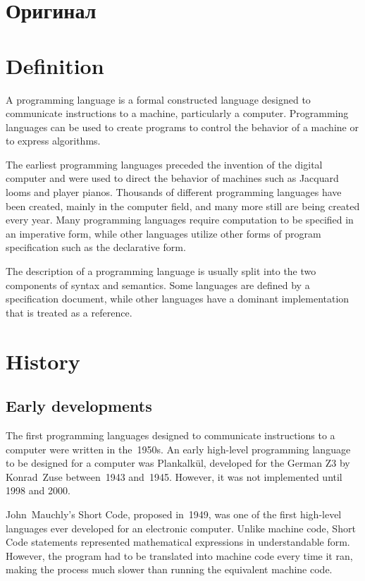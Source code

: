 \newpage
\chapter*{Оригинал}
\vspace{-1em}

\chapter{Definition}
A programming language is a formal constructed language designed to
commu\-nicate instructions to a machine, particularly a computer. Programming
languages can be used to create programs to control the behavior of a machine
or to express algorithms.

The earliest programming languages preceded the invention of the digital
com\-puter and were used to direct the behavior of machines such as Jacquard
looms and player pianos. Thousands of different programming languages have been
created, mainly in the computer field, and many more still are being created
every year. Many programming languages require computation to be specified in
an imperative form, while other languages utilize other forms of program
specification such as the declarative form.

The description of a programming language is usually split into the two
compo\-nents of syntax and semantics. Some languages are defined by a
specification document, while other languages have a dominant implementation
that is treated as a reference.

\chapter{History}
\section{Early developments}
The first programming languages designed to communicate instructions to a
computer were written in the~1950s. An early high-level programming language
to be designed for a computer was Plankalk\"{u}l, developed for the German Z3 by
Konrad~Zuse between~1943 and~1945. However, it was not implemented until 1998
and 2000.

John~Mauchly's Short Code, proposed in~1949, was one of the first high-level
languages ever developed for an electronic computer. Unlike machine code, Short
Code statements represented mathematical expressions in understandable form.
However, the program had to be translated into machine code every time it ran,
making the process much slower than running the equivalent machine code.

